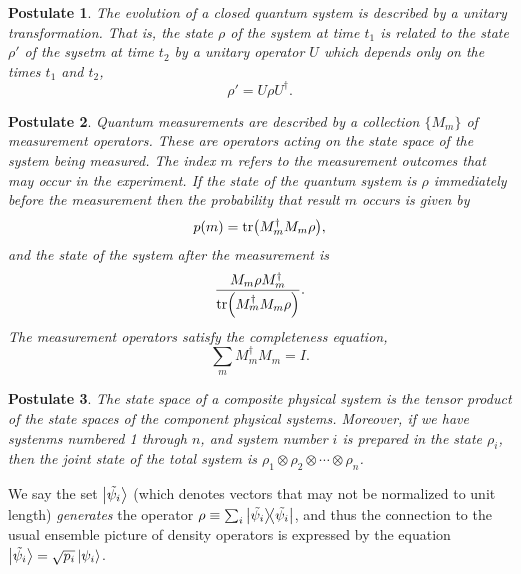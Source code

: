 \documentclass{article}
\numberwithin{theorem}{section}
\numberwithin{corollary}{section}
\newtheorem{postulate}{Postulate}
\numberwithin{postulate}{section}
\begin{document}
\begin{postulate}
  The evolution of a closed quantum system is described by a unitary
  transformation. That is, the state $\rho$ of the system at time $t_1$ is
  related to the state $\rho'$ of the sysetm at time $t_2$ by a unitary
  operator $U$ which depends only on the times $t_1$ and $t_2$, \[
    \rho' = U \rho U^{\dagger}.
  \]
\end{postulate}

\begin{postulate}
  Quantum measurements are described by a collection $\{M_m\}$ of
  \emph{measurement operators}. These are operators acting on the state space
  of the system being measured. The index $m$ refers to the measurement
  outcomes that may occur in the experiment. If the state of the quantum system
  is $\rho$ immediately before the measurement then the probability that result
  $m$ occurs is given by \[
    p(m) = \tr(M_m^{\dagger}M_m\rho),
  \] and the state of the system after the measurement is \[
    \frac{M_m \rho M_m^{\dagger}}{\tr(M_m^{\dagger}M_m\rho)}.
  \] The measurement operators satisfy the completeness equation, \[
    \sum_m M_m^{\dagger}M_m = I.
  \]
\end{postulate}

\begin{postulate}
  The state space of a composite physical system is the tensor product of the
  state spaces of the component physical systems. Moreover, if we have systenms
  numbered 1 through $n$, and system number $i$ is prepared in the state
  $\rho_i$, then the joint state of the total system is $\rho_1 \otimes \rho_2
  \otimes \cdots \otimes \rho_n$.
\end{postulate}

We say the set $\ket{\tilde{\psi_i}}$ (which denotes vectors that may not be
normalized to unit length) \emph{generates} the operator $\rho \equiv \sum_i
\op{\tilde{\psi_i}}$, and thus the connection to the usual ensemble picture
of density operators is expressed by the equation $\ket{\tilde{\psi_i}} =
\sqrt{p_i}\ket{\psi_i}$.
\end{document}
